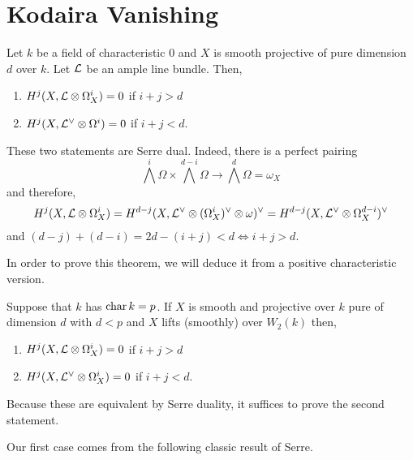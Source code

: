 \documentclass[12pt]{article}
\begin{document}
\section{Kodaira Vanishing}


\begin{thm}
Let $k$ be a field of characteristic $0$ and $X$ is smooth projective of pure dimension $d$ over $k$. Let $\mathcal{L}$ be an ample line bundle. Then,
\begin{enumerate}
\item $H^j(X, \mathcal{L} \otimes \Omega_X^i) = 0$ if $i + j > d$
\item $H^j(X, \mathcal{L}^{\vee} \otimes \Omega^i) = 0$ if $i + j < d$.
\end{enumerate}
\end{thm}

\begin{rmk}
These two statements are Serre dual. Indeed, there is a perfect pairing 
\[ \bigwedge^i \Omega \times \bigwedge^{d-i} \Omega \to \bigwedge^d \Omega = \omega_X \]
and therefore,
\[ H^j(X, \mathcal{L} \otimes \Omega_X^i) = H^{d-j}(X, \mathcal{L}^{\vee} \otimes (\Omega_X^i)^\vee \otimes \omega)^\vee = H^{d-j}(X, \mathcal{L}^\vee \otimes \Omega_X^{d-i})^\vee \]
and $(d - j) + (d - i) = 2 d - (i + j) < d \iff i + j > d$.
\end{rmk}


\begin{rmk}
In order to prove this theorem, we will deduce it from a positive characteristic version.
\end{rmk}

\begin{thm}
Suppose that $k$ has $\operatorname{\mathrm{char}}{k} = p$. If $X$ is smooth and projective over $k$ pure of dimension $d$ with $d < p$ and $X$ lifts (smoothly) over $W_2(k)$ then,
\begin{enumerate}
\item $H^j(X, \mathcal{L} \otimes \Omega_X^i) = 0$ if $i + j > d$
\item $H^j(X, \mathcal{L}^{\vee} \otimes \Omega^i_X) = 0$ if $i + j < d$.
\end{enumerate}
\end{thm}

\begin{rmk}
Because these are equivalent by Serre duality, it suffices to prove the second statement.
\end{rmk}

\begin{rmk}
Our first case comes from the following classic result of Serre.
\end{rmk}
\end{document}
